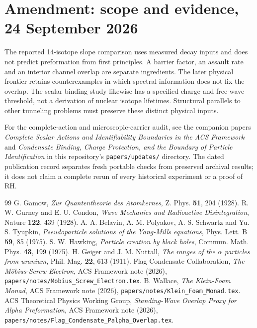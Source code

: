 \documentclass[11pt,a4paper]{article}
\theoremstyle{remark}
\begin{document}
\section*{Amendment: scope and evidence, 24 September 2026}
The reported 14-isotope slope comparison uses measured decay inputs and does not predict preformation from first principles. A barrier factor, an assault rate and an interior channel overlap are separate ingredients. The later physical frontier retains counterexamples in which spectral information does not fix the overlap. The scalar binding study likewise has a specified charge and free-wave threshold, not a derivation of nuclear isotope lifetimes. Structural parallels to other tunneling problems must preserve these distinct physical inputs.

For the complete-action and microscopic-carrier audit, see the companion
papers \emph{Complete Scalar Actions and Identifiability Boundaries in the ACS
Framework} and \emph{Condensate Binding, Charge Protection, and the Boundary
of Particle Identification} in this repository's \texttt{papers/updates/}
directory. The dated publication record separates fresh portable checks
from preserved archival results; it does not claim a complete rerun of every
historical experiment or a proof of RH.

\begin{thebibliography}{99}
 G. Gamow, \emph{Zur Quantentheorie des Atomkernes}, Z. Phys. \textbf{51}, 204 (1928).
 R. W. Gurney and E. U. Condon, \emph{Wave Mechanics and Radioactive Disintegration}, Nature \textbf{122}, 439 (1928).
 A. A. Belavin, A. M. Polyakov, A. S. Schwartz and Yu. S. Tyupkin, \emph{Pseudoparticle solutions of the Yang-Mills equations}, Phys. Lett. B \textbf{59}, 85 (1975).
 S. W. Hawking, \emph{Particle creation by black holes}, Commun. Math. Phys. \textbf{43}, 199 (1975).
 H. Geiger and J. M. Nuttall, \emph{The ranges of the $\alpha$ particles from uranium}, Phil. Mag. \textbf{22}, 613 (1911).
 Flag Condensate Collaboration, \emph{The M\"obius-Screw Electron}, ACS Framework note (2026), \nolinkurl{papers/notes/Mobius_Screw_Electron.tex}.
 B. Wallace, \emph{The Klein-Foam Monad}, ACS Framework note (2026), \nolinkurl{papers/notes/Klein_Foam_Monad.tex}.
 ACS Theoretical Physics Working Group, \emph{Standing-Wave Overlap Proxy for Alpha Preformation}, ACS Framework note (2026), \nolinkurl{papers/notes/Flag_Condensate_Palpha_Overlap.tex}.
\end{thebibliography}
\end{document}
